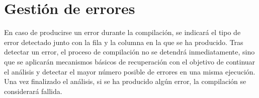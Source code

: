 \documentclass[12pt,a4paper]{article}
\begin{document}
\section{Gestión de errores}

En caso de producirse un error durante la compilación, se indicará el tipo de error detectado junto con la fila y la columna en la que se ha producido. Tras detectar un error, el proceso de compilación no se detendrá inmediatamente, sino que se aplicarán mecanismos básicos de recuperación con el objetivo de continuar el análisis y detectar el mayor número posible de errores en una misma ejecución. Una vez finalizado el análisis, si se ha producido algún error, la compilación se considerará fallida.
\end{document}
